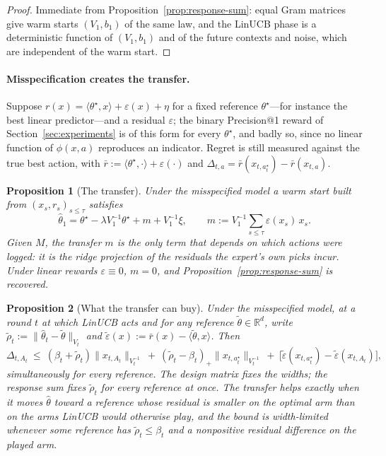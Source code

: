 \documentclass{article}
\newtheorem{proposition}{Proposition}
\theoremstyle{definition}
\theoremstyle{remark}
\newcommand{\R}{\mathbb{R}}
\theoremstyle{remark}
\begin{document}
\begin{proof}
Immediate from Proposition~\ref{prop:response-sum}: equal Gram matrices give
warm starts $(V_1,b_1)$ of the same law, and the LinUCB phase is a
deterministic function of $(V_1,b_1)$ and of the future contexts and noise,
which are independent of the warm start.
\end{proof}

\paragraph{Misspecification creates the transfer.}
Suppose $r(x)=\langle\theta^\star,x\rangle+\varepsilon(x)+\eta$ for a fixed
reference $\theta^\star$---for instance the best linear predictor---and a
residual $\varepsilon$; the binary Precision@1 reward of
Section~\ref{sec:experiments} is of this form for every $\theta^\star$, and
badly so, since no linear function of $\phi(x,a)$ reproduces an indicator.
Regret is still measured against the true best action, with
$\bar r:=\langle\theta^\star,\cdot\rangle+\varepsilon(\cdot)$ and
$\Delta_{t,a}=\bar r(x_{t,a^\star_t})-\bar r(x_{t,a})$.

\begin{proposition}[The transfer]
\label{prop:transfer}
Under the misspecified model a warm start built from $(x_s,r_s)_{s\le\tau}$
satisfies
\[
\widehat\theta_1=\theta^\star-\lambda V_1^{-1}\theta^\star+m+V_1^{-1}\xi,
\qquad
m:=V_1^{-1}\sum_{s\le\tau}\varepsilon(x_s)\,x_s .
\]
Given $M$, the \emph{transfer} $m$ is the only term that depends on which
actions were logged: it is the ridge projection of the residuals the expert's
own picks incur. Under linear rewards $\varepsilon\equiv0$, $m=0$, and
Proposition~\ref{prop:response-sum} is recovered.
\end{proposition}

\begin{proposition}[What the transfer can buy]
\label{prop:transfer-regret}
Under the misspecified model, at a round $t$ at which LinUCB acts and for any
reference $\widetilde\theta\in\R^d$, write
$\widetilde\rho_t:=\|\widehat\theta_t-\widetilde\theta\|_{V_t}$ and
$\widetilde\varepsilon(x):=\bar r(x)-\langle\widetilde\theta,x\rangle$. Then
\[
\Delta_{t,A_t}\ \le\ (\beta_t+\widetilde\rho_t)\|x_{t,A_t}\|_{V_t^{-1}}
\ +\ (\widetilde\rho_t-\beta_t)_+\|x_{t,a^\star_t}\|_{V_t^{-1}}
\ +\ \bigl[\widetilde\varepsilon(x_{t,a^\star_t})-\widetilde\varepsilon(x_{t,A_t})\bigr],
\]
simultaneously for every reference. The design matrix fixes the widths; the
response sum fixes $\widetilde\rho_t$ for every reference at once. The
transfer helps exactly when it moves $\widehat\theta$ toward a reference whose
residual is smaller on the optimal arm than on the arms LinUCB would otherwise
play, and the bound is width-limited whenever some reference has
$\widetilde\rho_t\le\beta_t$ and a nonpositive residual difference on the
played arm.
\end{proposition}
\end{document}
